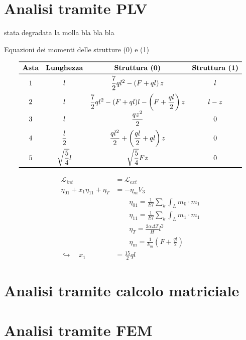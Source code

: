 \section{Analisi tramite PLV}
\e stata degradata la molla bla bla bla

\begin{table}[H]
\caption{Equazioni dei momenti delle strutture (0) e (1)}
\[
\begin{array}{cccc}
	\toprule
	\textbf{Asta}&\textbf{Lunghezza} & \textbf{Struttura (0)} & \textbf{Struttura (1)}\\
	\midrule
	1&l&\dfrac{7}{2}ql^2-\left(F+ql\right)z&l\\[2ex]
	2&l&\dfrac{7}{2}ql^2-(F+ql)l-\left(F+\dfrac{ql}{2}\right)z &l-z\\
	3&l&\dfrac{qz^2}{2}&0\\[2ex]
	4&\dfrac{l}{2}&\dfrac{ql^2}{2}+\left(\dfrac{ql}{2} + ql\right)z&0\\[2ex]
	5&\sqrt{\dfrac{5}{4}}l&\sqrt{\dfrac{5}{4}}Fz&0\\
	\bottomrule
\end{array}
\]
\end{table}

\begin{align*}
	\mathscr{L}_{int} &= \mathscr{L}_{ext}	\\
	\eta_{01}+x_1 \eta_{11} + \eta_T &= - \eta_m V_3 \\
	& \qquad \eta_{01}= \frac{1}{EI}\sum_{k}\int_L m_0 \cdot m_1\\
	& \qquad \eta_{11}= \frac{1}{EI}\sum_{k}\int_L m_1 \cdot m_1\\
	& \qquad \eta_T = \frac{2 \alpha \Delta T}{H}l^2 \\
	& \qquad \eta_m = \frac{1}{k_m} \left( F+\frac{ql}{2}\right)\\
	 \hookrightarrow \quad  x_1 &= \frac{15}{2}ql
\end{align*}
%
\section{Analisi tramite calcolo matriciale}
\section{Analisi tramite FEM}


